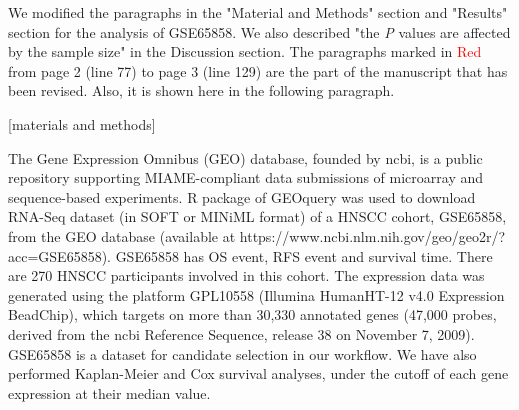 \documentclass[preprint,12pt]{elsarticle}
\newenvironment{MyColorPar}[1]{%
    \leavevmode\color{#1}\ignorespaces%
}{%
}%
\begin{document}
\begin{MyColorPar}{blue}



We modified the paragraphs in the "Material and Methods" section and "Results" section for the analysis of GSE65858.
We also described "the \textit{P} values are affected by the sample size" in the Discussion section.
The paragraphs marked in \textcolor{red}{Red} from page 2 (line 77) to page 3 (line 129) are the part of the manuscript that has been revised. Also, it is shown here in the following paragraph.
\\[0.3cm]

\begin{MyColorPar}{red}


[materials and methods]


The Gene Expression Omnibus (GEO) database, founded by \acrfull{ncbi}, is a public repository supporting MIAME-compliant data submissions of microarray and sequence-based experiments.
R package of GEOquery\cite{Sean2007} was used to
download RNA-Seq dataset (in SOFT or MINiML format) of a HNSCC cohort, GSE65858, from the GEO database (available at https://www.ncbi.nlm.nih.gov/geo/geo2r/?\\acc=GSE65858). 
GSE65858\cite{Wichmann2015} has OS event, RFS event and survival time.
There are 270 HNSCC participants involved in this cohort.
The expression data was generated using the platform GPL10558 (Illumina HumanHT-12 v4.0 Expression BeadChip), which targets on more than 30,330 annotated genes (47,000 probes, derived from the \acrshort{ncbi} Reference Sequence, release 38 on November 7, 2009). %
GSE65858 is a dataset for candidate selection in our workflow.
We have also performed Kaplan-Meier and Cox survival analyses, under the cutoff of each gene expression at their median value.\\




\end{MyColorPar}
\end{MyColorPar}
\end{document}
